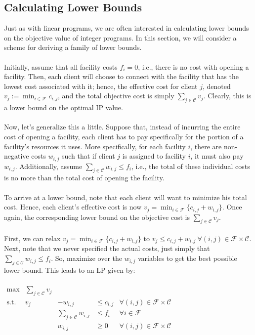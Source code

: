 \documentclass[11pt]{article}
\newcommand{\scf}{\ensuremath{\mathcal{F}}\xspace}
\newcommand{\scc}{\ensuremath{\mathcal{C}}\xspace}
\begin{document}
\subsection*{Calculating Lower Bounds}
Just as with linear programs, we are often interested in calculating
lower bounds on the objective value of integer programs. In this
section, we will consider a scheme for deriving a family of lower
bounds.\\
\\
Initially, assume that all facility costs $f_i = 0$, i.e., there is
no cost with opening a facility. Then, each client will choose to
connect with the facility that has the lowest cost associated with
it; hence, the effective cost for client $j$, denoted $v_j :=
\min_{i\in\scf} c_{i,j}$, and the total objective cost is simply
$\sum_{j\in\scc} v_j$. Clearly, this is a lower bound on the optimal
 IP value.\\
\\
Now, let's generalize this a little. Suppose that, instead of
incurring the entire cost of opening a facility, each client has to
pay specifically for the portion of a facility's resources it uses.
More specifically, for each facility $i$, there are non-negative
costs $w_{i,j}$ such that if client $j$ is assigned to facility $i$,
it must also pay $w_{i,j}$. Additionally, assume $\sum_{j\in\scc}
w_{i,j}\leq f_i$, i.e., the total of these individual costs is no
more than the total
cost of opening the facility.\\
\\
To arrive at a lower bound, note that each client will want to
minimize his total cost. Hence, each client's effective cost is now
$v_j = \min_{i\in\scf} \lbrace c_{i,j}+w_{i,j} \rbrace$. Once again, the
corresponding lower bound on the objective cost is
$\sum_{j\in\scc}v_j$.\\
\\
First, we can relax $v_j = \min_{i\in\scf} \lbrace c_{i,j}+w_{i,j} \rbrace$ to $v_j
\leq c_{i,j}+w_{i,j}\ \forall (i,j)\in\scf\times\scc$. Next, note
that we never specified the actual costs, just simply that
$\sum_{j\in\scc} w_{i,j}\leq f_i$. So, maximize over the $w_{i,j}$
variables to get the best possible lower bound. This leads to an LP
given by:\\
\\
$\begin{array}{lrrll}
\max & \sum_{j\in\scc} v_j &&&\\
\mbox{s.t.} & v_j & - w_{i,j} & \leq c_{i,j} & \forall
(i,j)\in\scf\times\scc\\
&&\sum_{j\in\scc} w_{i,j} & \leq f_i & \forall i\in\scf\\
&&w_{i,j}&\geq 0&\forall
(i,j)\in\scf\times\scc\\
\end{array}$
\\
\end{document}
